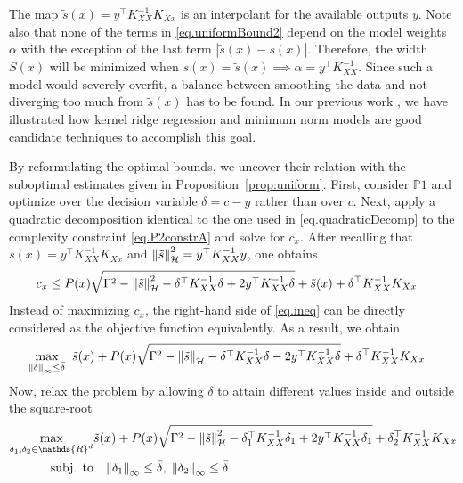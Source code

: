 The map $\tilde{s}(x) = y^\top K_{XX}^{-1} K_{Xx}$ is an interpolant for the available outputs $y$. Note also that none of the terms in \eqref{eq.uniformBound2} depend on the model weights $\alpha$ with the exception of the last term $|\tilde s(x) - s(x)|$. Therefore, the width $S(x)$ will be minimized when $s(x) = \tilde s(x) \implies \alpha = y^\top K_{XX}^{-1}$. Since such a model would severely overfit, a balance between smoothing the data and not diverging too much from $\tilde s(x)$ has to be found. In our previous work \cite{maddalena2020deterministic}, we have illustrated how kernel ridge regression and minimum norm models are good candidate techniques to accomplish this goal.

By reformulating the optimal bounds, we uncover their relation with the suboptimal estimates given in Proposition~\ref{prop:uniform}. First, consider $\mathds{P}1$ and optimize over the decision variable $\delta = c - y$ rather than over $c$. Next, apply a quadratic decomposition identical to the one used in \eqref{eq.quadraticDecomp} to the complexity constraint \eqref{eq.P2constrA} and solve for $c_x$. After recalling that $\tilde{s}(x) = y^\top K_{XX}^{-1} K_{Xx}$ and $\left\| \tilde s \right\|_\mathcal{H}^2 = y^\top K_{XX}^{-1} y$, one obtains
\begin{equation}
	\begin{aligned}
		c_x  \leq \;&  P(x) \sqrt{ \Gamma^2 - \left\| \tilde s \right\|_\mathcal{H}^2 - \delta^\top K_{XX}^{-1}\delta +2y^\top K_{XX}^{-1}\delta} +\tilde s(x) 
		+ \delta^\top K_{XX}^{-1}K_{Xx}
	\end{aligned}	
	\label{eq.ineq}
\end{equation}
Instead of maximizing $c_x$, the right-hand side of \eqref{eq.ineq} can be directly considered as the objective function equivalently. As a result, we obtain 
\[
\begin{aligned}
	\max_{\left\| \delta \right\|_\infty \leq \bar \delta}\;\;& \tilde s(x) + P(x) \sqrt{ \Gamma^2 - \left\| \tilde s \right\|_\mathcal{H} - \delta^\top K_{XX}^{-1}\delta -2y^\top K_{XX}^{-1}\delta} + \delta^\top K_{XX}^{-1}K_{Xx} 
\end{aligned}
\]
Now, relax the problem by allowing $\delta$ to attain different values inside and outside the square-root
\begin{subequations}
	\begin{align}\notag
		\max_{\delta_1,\delta_2 \in \mathds{R}^{d}} &  \tilde s(x) + P(x) \sqrt{ \Gamma^2 - \rknorm{\tilde s}^2 - \delta_1^\top K_{XX}^{-1}\delta_1 +2y^\top K_{XX}^{-1}\delta_1} + \delta_2^\top K_{XX}^{-1}K_{Xx} \\ \label{eq.relaxedObjective}
		\text{\normalfont subj. to} & \;\; \; \infnorm{\delta_1} \leq \bar \delta, \; \infnorm{\delta_2} \leq \bar \delta 
	\end{align}
\end{subequations}
